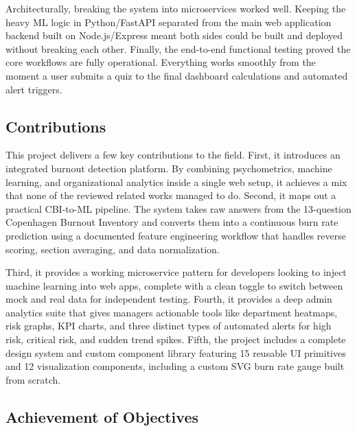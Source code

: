 \documentclass[12pt,a4paper]{article}
\begin{document}
Architecturally, breaking the system into microservices worked well. Keeping the heavy ML logic in Python/FastAPI separated from the main web application backend built on Node.js/Express meant both sides could be built and deployed without breaking each other. Finally, the end-to-end functional testing proved the core workflows are fully operational. Everything works smoothly from the moment a user submits a quiz to the final dashboard calculations and automated alert triggers.

\subsection{Contributions}

This project delivers a few key contributions to the field. First, it introduces an integrated burnout detection platform. By combining psychometrics, machine learning, and organizational analytics inside a single web setup, it achieves a mix that none of the reviewed related works managed to do. Second, it maps out a practical CBI-to-ML pipeline. The system takes raw answers from the 13-question Copenhagen Burnout Inventory and converts them into a continuous burn rate prediction using a documented feature engineering workflow that handles reverse scoring, section averaging, and data normalization.

Third, it provides a working microservice pattern for developers looking to inject machine learning into web apps, complete with a clean toggle to switch between mock and real data for independent testing. Fourth, it provides a deep admin analytics suite that gives managers actionable tools like department heatmaps, risk graphs, KPI charts, and three distinct types of automated alerts for high risk, critical risk, and sudden trend spikes. Fifth, the project includes a complete design system and custom component library featuring 15 reusable UI primitives and 12 visualization components, including a custom SVG burn rate gauge built from scratch.

\subsection{Achievement of Objectives}
\end{document}
